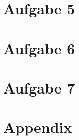 \documentclass[10pt,a4paper]{article}
\begin{document}
\section*{Aufgabe 5}
\setcounter{subsection}{0}

\section*{Aufgabe 6}

\section*{Aufgabe 7}

\newpage
\section*{Appendix}
\end{document}
